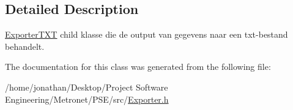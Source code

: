 \subsection{Detailed Description}
\hyperlink{class_exporter_t_x_t}{Exporter\+T\+XT} child klasse die de output van gegevens naar een txt-\/bestand behandelt. 

The documentation for this class was generated from the following file\+:\begin{DoxyCompactItemize}
\item 
/home/jonathan/\+Desktop/\+Project Software Engineering/\+Metronet/\+P\+S\+E/src/\hyperlink{_exporter_8h}{Exporter.\+h}\end{DoxyCompactItemize}
